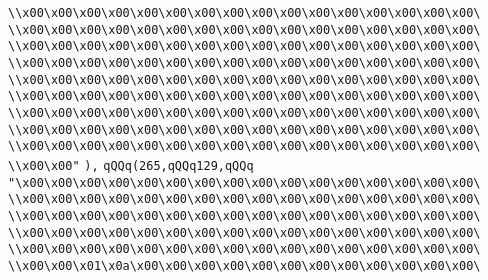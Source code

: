 \verb|\\x00\x00\x00\x00\x00\x00\x00\x00\x00\x00\x00\x00\x00\x00\x00\x00\|\newline
\verb|\\x00\x00\x00\x00\x00\x00\x00\x00\x00\x00\x00\x00\x00\x00\x00\x00\|\newline
\verb|\\x00\x00\x00\x00\x00\x00\x00\x00\x00\x00\x00\x00\x00\x00\x00\x00\|\newline
\verb|\\x00\x00\x00\x00\x00\x00\x00\x00\x00\x00\x00\x00\x00\x00\x00\x00\|\newline
\verb|\\x00\x00\x00\x00\x00\x00\x00\x00\x00\x00\x00\x00\x00\x00\x00\x00\|\newline
\verb|\\x00\x00\x00\x00\x00\x00\x00\x00\x00\x00\x00\x00\x00\x00\x00\x00\|\newline
\verb|\\x00\x00\x00\x00\x00\x00\x00\x00\x00\x00\x00\x00\x00\x00\x00\x00\|\newline
\verb|\\x00\x00\x00\x00\x00\x00\x00\x00\x00\x00\x00\x00\x00\x00\x00\x00\|\newline
\verb|\\x00\x00\x00\x00\x00\x00\x00\x00\x00\x00\x00\x00\x00\x00\x00\x00\|\newline
\verb|\\x00\x00"|\newline
\verb|),|\newline
\verb|qQQq(265,qQQq129,qQQq|\newline
\verb|"\x00\x00\x00\x00\x00\x00\x00\x00\x00\x00\x00\x00\x00\x00\x00\x00\|\newline
\verb|\\x00\x00\x00\x00\x00\x00\x00\x00\x00\x00\x00\x00\x00\x00\x00\x00\|\newline
\verb|\\x00\x00\x00\x00\x00\x00\x00\x00\x00\x00\x00\x00\x00\x00\x00\x00\|\newline
\verb|\\x00\x00\x00\x00\x00\x00\x00\x00\x00\x00\x00\x00\x00\x00\x00\x00\|\newline
\verb|\\x00\x00\x00\x00\x00\x00\x00\x00\x00\x00\x00\x00\x00\x00\x00\x00\|\newline
\verb|\\x00\x00\x01\x0a\x00\x00\x00\x00\x00\x00\x00\x00\x00\x00\x00\x00\|\newline
